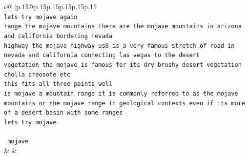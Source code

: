 \documentclass{article}
\begin{document}
{\begin{supertabular}{c@{$\;$}|p{.15\linewidth}@{}p{.15\linewidth}p{.15\linewidth}p{.15\linewidth}p{.15\linewidth}p{.15\linewidth}}
{{{\\ 
\texttt{lets try mojave again} \\
\texttt{range the mojave mountains there are the mojave mountains in arizona and california bordering nevada} \\
\texttt{highway the mojave highway us6 is a very famous stretch of road in nevada and california connecting las vegas to the desert} \\
\texttt{vegetation the mojave is famous for its dry brushy desert vegetation cholla creosote etc} \\
\texttt{this fits all three points well} \\
\texttt{is mojave a mountain range it is commonly referred to as the mojave mountains or the mojave range in geological contexts even if its more of a desert basin with some ranges} \\
\texttt{lets try mojave} \\
\\ 
\texttt{ mojave} \\
            }
        }
    }
    & & \\ \\


\end{supertabular}}
\end{document}
